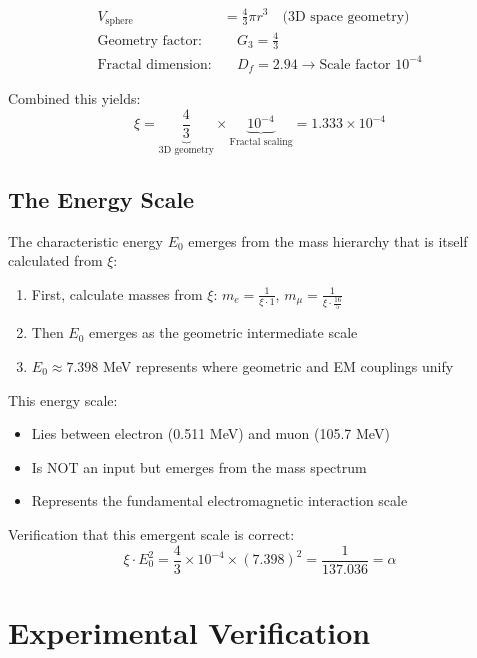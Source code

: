 \documentclass[12pt,a4paper]{article}
\theoremstyle{definition}
\begin{document}
\begin{align}
	V_{\text{sphere}} &= \frac{4}{3}\pi r^3 \quad \text{(3D space geometry)}\\
	\text{Geometry factor:} & \quad G_3 = \frac{4}{3}\\
	\text{Fractal dimension:} & \quad D_f = 2.94 \rightarrow \text{Scale factor } 10^{-4}
\end{align}

Combined this yields:
\begin{equation}
	\xi = \underbrace{\frac{4}{3}}_{\text{3D geometry}} \times \underbrace{10^{-4}}_{\text{Fractal scaling}} = 1.333 \times 10^{-4}
\end{equation}
	
	\subsection{The Energy Scale}
	
	The characteristic energy $E_0$ emerges from the mass hierarchy that is itself calculated from $\xi$:
	
	\begin{enumerate}
		\item First, calculate masses from $\xi$: $m_e = \frac{1}{\xi \cdot 1}$, $m_\mu = \frac{1}{\xi \cdot \frac{16}{5}}$
		\item Then $E_0$ emerges as the geometric intermediate scale
		\item $E_0 \approx 7.398$ MeV represents where geometric and EM couplings unify
	\end{enumerate}
	
	This energy scale:
	\begin{itemize}
		\item Lies between electron (0.511 MeV) and muon (105.7 MeV) 
		\item Is NOT an input but emerges from the mass spectrum
		\item Represents the fundamental electromagnetic interaction scale
	\end{itemize}
	
	Verification that this emergent scale is correct:
	\begin{equation}
		\xi \cdot E_0^2 = \frac{4}{3} \times 10^{-4} \times (7.398)^2 = \frac{1}{137.036} = \alpha
	\end{equation}
	
	\section{Experimental Verification}
	
\end{document}
